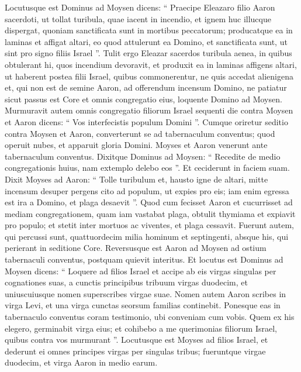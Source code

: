 \begin{biblechapter}
\begin{biblechapter}
\begin{biblechapter}
\begin{biblechapter}
\begin{biblechapter}
\begin{biblechapter}
\begin{biblechapter}
\begin{biblechapter}
\begin{biblechapter}
\begin{biblechapter}
\begin{biblechapter}
\begin{biblechapter}
\begin{biblechapter}
\begin{biblechapter}
\begin{biblechapter}
\begin{biblechapter}
\begin{biblechapter}
\verse Locutusque est Dominus ad Moysen dicens: 
\verse “ Praecipe Eleazaro filio Aaron sacerdoti, ut tollat turibula, quae iacent in incendio, et ignem huc illucque dispergat, quoniam sanctificata sunt 
\verse in mortibus peccatorum; producatque ea in laminas et affigat altari, eo quod attulerunt ea Domino, et sanctificata sunt, ut sint pro signo filiis Israel ”. 
\verse Tulit ergo Eleazar sacerdos turibula aenea, in quibus obtulerant hi, quos incendium devoravit, et produxit ea in laminas affigens altari, 
\verse ut haberent postea filii Israel, quibus commonerentur, ne quis accedat alienigena et, qui non est de semine Aaron, ad offerendum incensum Domino, ne patiatur sicut passus est Core et omnis congregatio eius, loquente Domino ad Moysen.
 \verse Murmuravit autem omnis congregatio filiorum Israel sequenti die contra Moysen et Aaron dicens: “ Vos interfecistis populum Domini ”. 
\verse Cumque oriretur seditio contra Moysen et Aaron, converterunt se ad tabernaculum conventus; quod operuit nubes, et apparuit gloria Domini. 
\verse Moyses et Aaron venerunt ante tabernaculum conventus. 
\verse Dixitque Dominus ad Moysen: 
\verse “ Recedite de medio congregationis huius, nam extemplo delebo eos ”. Et ceciderunt in faciem suam. 
\verse Dixit Moyses ad Aaron: “ Tolle turibulum et, hausto igne de altari, mitte incensum desuper pergens cito ad populum, ut expies pro eis; iam enim egressa est ira a Domino, et plaga desaevit ”. 
\verse Quod cum fecisset Aaron et cucurrisset ad mediam congregationem, quam iam vastabat plaga, obtulit thymiama et expiavit pro populo; 
\verse et stetit inter mortuos ac viventes, et plaga cessavit. 
\verse Fuerunt autem, qui percussi sunt, quattuordecim milia hominum et septingenti, absque his, qui perierant in seditione Core. 
\verse Reversusque est Aaron ad Moysen ad ostium tabernaculi conventus, postquam quievit interitus.
 \verse Et locutus est Dominus ad Moysen dicens: 
\verse “ Loquere ad filios Israel et accipe ab eis virgas singulas per cognationes suas, a cunctis principibus tribuum virgas duodecim, et uniuscuiusque nomen superscribes virgae suae. 
\verse Nomen autem Aaron scribes in virga Levi, et una virga cunctas seorsum familias continebit. 
\verse Ponesque eas in tabernaculo conventus coram testimonio, ubi conveniam cum vobis. 
\verse Quem ex his elegero, germinabit virga eius; et cohibebo a me querimonias filiorum Israel, quibus contra vos murmurant ”.
 \verse Locutusque est Moyses ad filios Israel, et dederunt ei omnes principes virgas per singulas tribus; fueruntque virgae duodecim, et virga Aaron in medio earum. 

\end{biblechapter}
\end{biblechapter}
\end{biblechapter}
\end{biblechapter}
\end{biblechapter}
\end{biblechapter}
\end{biblechapter}
\end{biblechapter}
\end{biblechapter}
\end{biblechapter}
\end{biblechapter}
\end{biblechapter}
\end{biblechapter}
\end{biblechapter}
\end{biblechapter}
\end{biblechapter}
\end{biblechapter}
